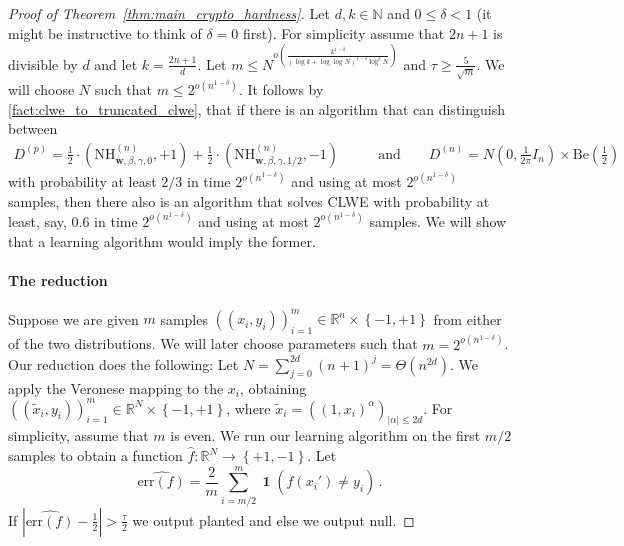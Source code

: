 \documentclass{theoretics}
\newcommand{\Paren}[1]{\left(#1\right)}
\newcommand{\Abs}[1]{\left\lvert#1\right\rvert}
\newcommand{\card}[1]{\lvert#1\rvert}
\newcommand{\Set}[1]{\left\{#1\right\}}
\DeclareMathOperator{\Ind}{\mathbf 1}
\newcommand{\N}{\mathbb N}
\newcommand{\R}{\mathbb R}
\renewcommand{\leq}{\leqslant}
\renewcommand{\geq}{\geqslant}
\newcommand{\err}{\mathrm{err}}
\newcommand{\nhclwed}[4]{\mathrm{NH}_{#1,#2,#3,#4}}
\newcommand{\BE}[1]{\mathrm{Be}\Paren{#1}}
\begin{document}
\begin{proof}[Proof of Theorem~\ref{thm:main_crypto_hardness}]
    Let $d, k \in \N$ and $0 \leq \delta < 1$ (it might be instructive to think of $\delta = 0$ first).
    For simplicity assume that $2n+1$ is divisible by $d$ and let $k = \tfrac {2n+1} d$.
    Let $m  \leq  N^{o\Paren{\tfrac{k^{1-\delta}}{\Paren{\log k + \log\log N}^{1-\delta} \log^\delta N}}}$ and $\tau \geq \tfrac 5 {\sqrt{m}}$.
    We will choose $N$ such that $m \leq 2^{o(n^{1-\delta})}$.
    It follows by \cref{fact:clwe_to_truncated_clwe}, that if there is an algorithm that can distinguish between
    \begin{align*}
        D^{(p)} = \frac 1 2 \cdot \Paren{\nhclwed{\bm w}{\beta}{\gamma}{0}^{(n)}, +1} + \frac 1 2 \cdot \Paren{\nhclwed{\bm w}{\beta}{\gamma}{1/2}^{(n)}, -1}\quad\quad&\text{and}\quad\quad D^{(n)} = N\Paren{0,\tfrac 1 {2\pi} I_n} \times \BE{\tfrac 1 2}
    \end{align*}
    with probability at least $2/3$ in time $2^{o(n^{1-\delta})}$ and using at most $2^{o(n^{1-\delta})}$ samples, then there also is an algorithm that solves CLWE with probability at least, say, $0.6$ in time $2^{o(n^{1-\delta})}$ and using at most $2^{o(n^{1-\delta})}$ samples.
    We will show that a learning algorithm would imply the former.


    \paragraph{The reduction}
    Suppose we are given $m$ samples
    $((x_i, y_i))_{i=1}^m \in \R^n \times \Set{-1,+1}$ from either of the two distributions.
    We will later choose parameters such that $m = 2^{o(n^{1-\delta})}$.
    Our reduction does the following:
    Let $N = \sum_{j = 0}^{2d} (n+1)^j = \Theta(n^{2d})$.
    We apply the Veronese mapping to the $x_i$, obtaining $((\tilde{x}_i, y_i))_{i=1}^m \in \R^N \times \Set{-1,+1}$, where $\tilde{x}_i = ((1,x_i)^\alpha)_{\card{\alpha} \leq 2d}$.
    For simplicity, assume that $m$ is even.
    We run our learning algorithm on the first $m/2$ samples to obtain a function $\hat{f} \colon \R^N \rightarrow \Set{+1,-1}$.
    Let
    \[
        \widehat{\err\Paren{f}} = \frac 2 m \sum_{i=m/2}^m \Ind\Paren{\hat{f}(x_i') \neq y_i} \,.
    \]
    If $\Abs{\widehat{\err\Paren{f}} - \frac 1 2} > \frac \tau 2$ we output planted and else we output null.


\end{proof}
\end{document}
